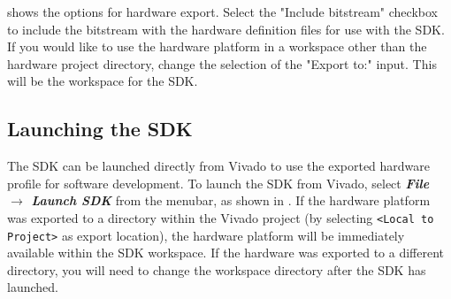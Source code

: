\noindent
{} shows the options for hardware export. Select the "Include bitstream" checkbox to include the bitstream with the hardware definition files for use with the SDK. If you would like to use the hardware platform in a workspace other than the hardware project directory, change the selection of the "Export to:" input. This will be the workspace for the SDK. \\



\subsection{Launching the SDK}

The SDK can be launched directly from Vivado to use the exported hardware profile for software development. To launch the SDK from Vivado, select \textit{\bfseries File $\rightarrow$ Launch SDK} from the menubar, as shown in . If the hardware platform was exported to a directory within the Vivado project (by selecting \texttt{<Local to Project>} as export location), the hardware platform will be immediately available within the SDK workspace. If the hardware was exported to a different directory, you will need to change the workspace directory after the SDK has launched.


